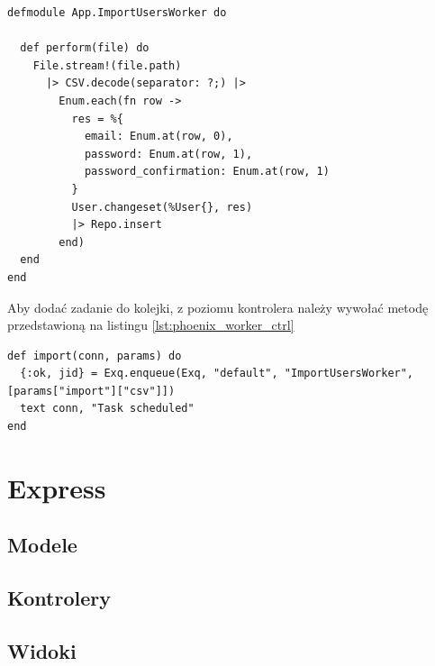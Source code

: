 \begin{lstlisting}[caption={Worker umożliwiający import użytkowników z pliku csv we frameworku Phoenix.},label={lst:phoenix_worker}]
defmodule App.ImportUsersWorker do

  def perform(file) do
    File.stream!(file.path)
      |> CSV.decode(separator: ?;) |>
        Enum.each(fn row ->
          res = %{
            email: Enum.at(row, 0),
            password: Enum.at(row, 1),
            password_confirmation: Enum.at(row, 1)
          }
          User.changeset(%User{}, res)
          |> Repo.insert
        end)
  end
end
\end{lstlisting}

Aby dodać zadanie do kolejki, z poziomu kontrolera należy wywołać metodę przedstawioną na listingu \ref{lst:phoenix_worker_ctrl}

\begin{lstlisting}[caption={Dodanie zadania do kolejki przetwarzania w tle we frameworku Phoenix.},label={lst:phoenix_worker_ctrl}]
def import(conn, params) do
  {:ok, jid} = Exq.enqueue(Exq, "default", "ImportUsersWorker", [params["import"]["csv"]])
  text conn, "Task scheduled"
end
\end{lstlisting}

\section{Express}
\subsection{Modele}

\subsection{Kontrolery}

\subsection{Widoki}
